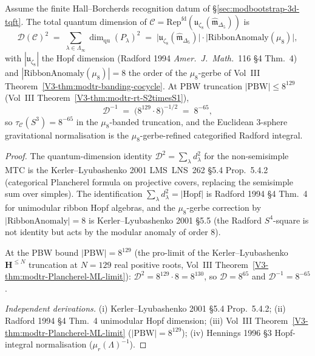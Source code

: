 \begin{theorem}
\label{thm:modbootstrap-D-closed-form}
\ClaimStatusConditional
Assume the finite Hall--Borcherds recognition datum of
\S\ref{sec:modbootstrap-3d-tqft}. The total quantum dimension of
$\mathcal C = \mathrm{Rep}^{\mathrm{fd}}(\mathfrak u_{\zeta_8}
(\widehat{\mathfrak m}_{\Delta_5}))$ is
\[
 \mathcal D(\mathcal C)^2
 \;=\;
 \sum_{\lambda\in\Lambda_\infty}\!\!\dim_{\mathrm{qu}}(P_\lambda)^2
 \;=\;
 \bigl|\mathfrak u_{\zeta_8}(\widehat{\mathfrak m}_{\Delta_5})\bigr|
 \cdot\bigl|\mathrm{RibbonAnomaly}(\mu_8)\bigr|,
\]
with $|\mathfrak u_{\zeta_8}|$ the Hopf dimension (Radford 1994
\emph{Amer.~J.~Math.}~116 \S 4 Thm.~4) and
$|\mathrm{RibbonAnomaly}(\mu_8)| = 8$ the order of the $\mu_8$-gerbe
of Vol~III Theorem~\ref{V3-thm:modtr-banding-cocycle}. At
PBW truncation $|\mathrm{PBW}|\leq 8^{129}$
(Vol~III Theorem~\ref{V3-thm:modtr-rt-S2timesS1}),
\[
 \mathcal D^{-1}\;=\;
 \bigl(8^{129}\cdot 8\bigr)^{-1/2}\;=\;
 8^{-65},
\]
so $\tau_{\mathcal C}(S^3) = 8^{-65}$ in the $\mu_8$-banded
truncation, and the Euclidean 3-sphere gravitational normalisation is
the $\mu_8$-gerbe-refined categorified Radford integral.
\end{theorem}

\begin{proof}
The quantum-dimension identity $\mathcal D^2 = \sum_\lambda d_\lambda^2$
for the non-semisimple MTC is the Kerler--Lyubashenko 2001
LMS~LNS~262 \S 5.4 Prop.~5.4.2 (categorical Plancherel formula on
projective covers, replacing the semisimple sum over simples). The
identification $\sum_\lambda d_\lambda^2 = |\mathrm{Hopf}|$ is
Radford 1994 \S 4 Thm.~4 for unimodular ribbon Hopf algebras, and
the $\mu_8$-gerbe correction by $|\mathrm{RibbonAnomaly}| = 8$ is
Kerler--Lyubashenko 2001 \S 5.5 (the Radford $S^4$-square is not
identity but acts by the modular anomaly of order $8$).

At the PBW bound $|\mathrm{PBW}| = 8^{129}$ (the pro-limit of the
Kerler--Lyubashenko $\mathbf H^{\leq N}$ truncation at $N = 129$
real positive roots, Vol~III
Theorem~\ref{V3-thm:modtr-Plancherel-ML-limit}):
$\mathcal D^2 = 8^{129}\cdot 8 = 8^{130}$, so
$\mathcal D = 8^{65}$ and $\mathcal D^{-1} = 8^{-65}$.

\emph{Independent derivations.}
(i) Kerler--Lyubashenko 2001 \S 5.4 Prop.~5.4.2;
(ii) Radford 1994 \S 4 Thm.~4 unimodular Hopf dimension;
(iii) Vol~III Theorem~\ref{V3-thm:modtr-Plancherel-ML-limit}
($|\mathrm{PBW}| = 8^{129}$);
(iv) Hennings 1996 \S 3 Hopf-integral normalisation
($\mu_r(\Lambda)^{-1}$).
\end{proof}

